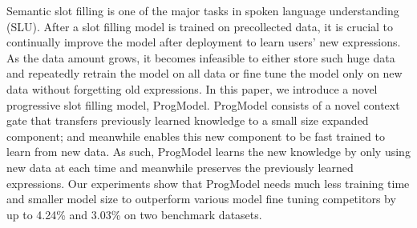 Semantic slot filling is one of the major tasks in spoken language understanding (SLU). After a slot filling model is trained on precollected data, it is crucial to continually improve the model after deployment to learn users’ new expressions. As the data amount grows, it becomes infeasible to either store such huge data and repeatedly retrain the model on all data or fine tune the model only on new data without forgetting old expressions. In this paper, we introduce a novel progressive slot filling model, ProgModel. ProgModel consists of a novel context gate that transfers previously learned knowledge to a small size expanded component; and meanwhile enables this new component to be fast trained to learn from new data. As such, ProgModel learns the new knowledge by only using new data at each time and meanwhile preserves the previously learned expressions. Our experiments show that ProgModel needs much less training time and smaller model size to outperform various model fine tuning competitors by up to 4.24\% and 3.03\% on two benchmark datasets.